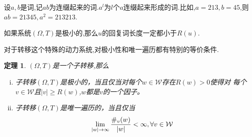 \documentclass[a4paper,11pt,oneside]{book}
\newtheorem{theorem}{\textbf{\hspace{0.7cm}定理}}[section]
\begin{document}
设$a,b$是词,记$ab$为连缀起来的词.$a^l$为$l$个$a$连缀起来形成的词.比如,$a=213,b=45$,则$ab=21345,a^2=213213$.

如果系统$(\Omega,T)$是极小的,那么$u$的回复词长度一定都小于$R(u)$.

对于转移这个特殊的动力系统,对极小性和唯一遍历都有特别的等价条件.

\begin{theorem}
\label{t:subshift}
$(\Omega,T)$是一个子转移,那么
\begin{enumerate}[(i)]
\item 子转移$(\Omega,T)$是极小的，当且仅当对每个$w\in \mathcal{W}$存在$R(w)>0$使得对%
每个$v\in \mathcal{W}$且$|v|\geq R(w)$,$w$都是$v$的一个因子。
\item 子转移$(\Omega,T)$是唯一遍历的，当且仅当$$\lim_{|w| \to \infty}{\#_v(w)\over |w |}<\infty, \forall v\in \mathcal{W}$$
\end{enumerate}
\end{theorem}
\end{document}
